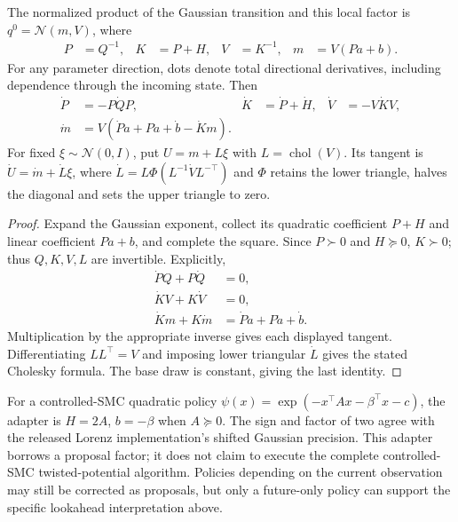 \begin{proposition}
\label{prop:bg-gaussian}
The normalized product of the Gaussian transition and this local factor is
$q^0=\mathcal N(m,V)$, where
\begin{align}
 P&=Q^{-1},& K&=P+H,& V&=K^{-1},& m&=V(Pa+b).
 \label{eq:bg-gaussian}
\end{align}
For any parameter direction, dots denote total directional derivatives,
including dependence through the incoming state. Then
\begin{align}
 \dot P&=-P\dot QP,& \dot K&=\dot P+\dot H,&
 \dot V&=-V\dot K V,\nonumber\\
 \dot m&=V(\dot P a+P\dot a+\dot b-\dot K m).
 \label{eq:bg-gaussian-tangent}
\end{align}
For fixed $\xi\sim\mathcal N(0,I)$, put $U=m+L\xi$ with
$L=\operatorname{chol}(V)$. Its tangent is
$\dot U=\dot m+\dot L\xi$, where
$\dot L=L\Phi(L^{-1}\dot V L^{-\top})$ and $\Phi$ retains the lower
triangle, halves the diagonal and sets the upper triangle to zero.
\end{proposition}
\begin{proof}
Expand the Gaussian exponent, collect its quadratic coefficient $P+H$ and
linear coefficient $Pa+b$, and complete the square. Since $P\succ0$ and
$H\succeq0$, $K\succ0$; thus $Q,K,V,L$ are invertible. Explicitly,
\begin{align*}
 \dot P Q+P\dot Q&=0,\\
 \dot K V+K\dot V&=0,\\
 \dot K m+K\dot m&=\dot P a+P\dot a+\dot b.
\end{align*}
Multiplication by the appropriate inverse gives each displayed tangent.
Differentiating $LL^\top=V$
and imposing lower triangular $\dot L$ gives the stated Cholesky formula.
The base draw is constant, giving the last identity.
\end{proof}
For a controlled-SMC quadratic policy
$\psi(x)=\exp(-x^\top A x-\beta^\top x-c)$, the adapter is
$H=2A$, $b=-\beta$ when $A\succeq0$. The sign and factor of two agree
with the released Lorenz implementation's shifted Gaussian precision. This
adapter borrows a proposal factor; it does not claim to execute the complete
controlled-SMC twisted-potential algorithm. Policies depending on the current
observation may still be corrected as proposals, but only a future-only
policy can support the specific lookahead interpretation above.

